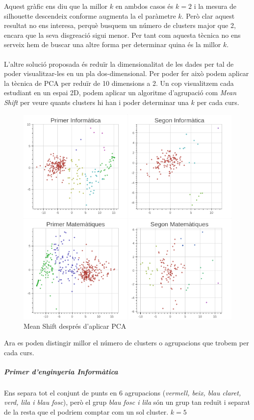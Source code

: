 \documentclass[12pt,a4paper,catalan]{article}
\begin{document}
Aquest gràfic ens diu que la millor $k$ en ambdos casos és $k=2$ i la mesura de silhouette descendeix conforme augmenta la el paràmetre $k$. Però clar aquest resultat no ens interesa, perquè busquem un número de clusters major que 2, encara que la seva disgreació sigui menor. Per tant com aquesta tècnica no ens serveix hem de buscar una altre forma per determinar quina és la millor $k$.
\\
\\
L'altre solució proposada és reduïr la dimensionalitat de les dades per tal de poder visualitzar-les en un pla dos-dimensional. Per poder fer això podem aplicar la tècnica de PCA per reduïr de 10 dimensions a 2. Un cop visualitzem cada estudiant en un espai 2D, podem aplicar un algoritme d'agrupació com \textit{Mean Shift} per veure quants clusters hi han i poder determinar una $k$ per cada curs.

\begin{figure}[h]
\centering
\includegraphics[width=\linewidth]{img/pca_info_mates.png}
\caption{Mean Shift després d'aplicar PCA}
\end{figure}

\newpage

Ara es poden distingir millor el número de clusters o agrupacions que trobem per cada curs.

\subparagraph{Primer d'enginyeria Informàtica}
Ens separa tot el conjunt de punts en 6 agrupacions (\textit{vermell, beix, blau claret, verd, lila i blau fosc}), però el grup \textit{blau fosc i lila} són un grup tan reduït i separat de la resta que el podriem comptar com un sol cluster. $k=5$
\end{document}
